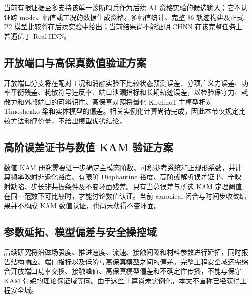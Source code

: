 当前有限证据至多支持该单一诊断哨兵作为后续 A1 资格实验的候选输入；它不认证跨 mode、幅值或工况的数据生成资格。多幅值统计、完整 96 轨迹构建及正式 P2 模型比较将在后续实验中给出；当前结果尚不能证明 CHNN 在该完整任务上普遍优于 Real HNN。

\subsection{开放端口与高保真数值验证方案}\label{sec:numerical-6-4}

开放端口分支将在配对工况和消融实验下比较状态预测误差、分项广义力误差、功率平衡残差、耗散符号违反率、端口泄漏指标和长期轨迹误差，以检验保守力、耗散力和外部端口的可辨识性。高保真对照将量化 Kirchhoff 主模型相对 Timoshenko 梁和实体模型的偏差。相关实例化计算尚待完成，因此本节仅规定比较方法和评价量，不给出模型优劣结论。

\subsection{高阶误差证书与数值 KAM 验证方案}\label{sec:numerical-6-5}

数值 KAM 研究需要进一步确定主模态阶数、可积参考系统和正规形系数，并计算频率映射非退化裕度、有限阶 Diophantine 裕度、高阶或解析误差证书、辛映射缺陷、步长非共振条件及不变环面残差。只有当总误差与所选 KAM 定理阈值在同一范数下可比较时，才能讨论数值认证。当前 canonical 闭合与时间步收敛结果并不构成 KAM 数值认证，也尚未获得不变环面。

\subsection{参数延拓、模型偏差与安全操控域}\label{sec:numerical-6-6}

后续研究将沿磁场强度、推进速度、流速、接触间隙和材料参数进行延拓，同时报告结构响应、端口指标以及低阶与高保真模型之间的偏差。完整工程安全域还需综合开放端口功率交换、接触峰值、高保真模型偏差和不确定性传播，不能与保守 KAM 骨架的理论保证域等同。由于这些计算尚未实例化，本文不宣称已经获得工程安全域。
